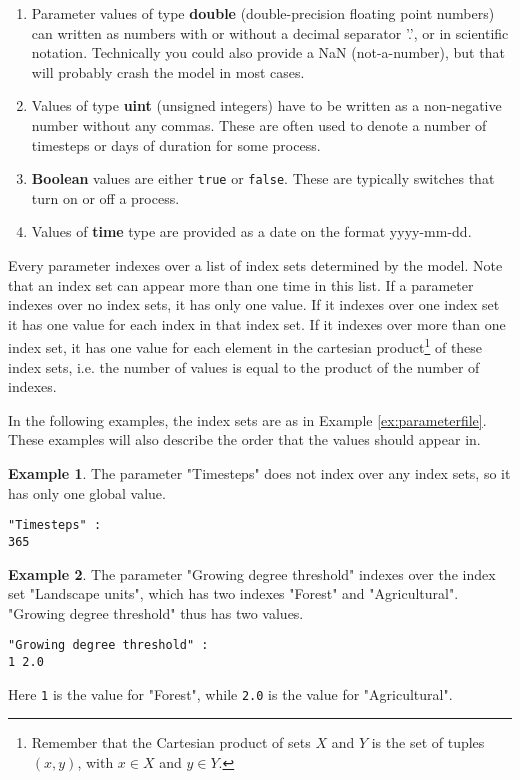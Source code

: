\documentclass[11pt]{article}
\theoremstyle{definition}
\newtheorem{myexample}{Example}
\newenvironment{example}%
  {\begin{lrbox}{\examplebox}%
   \begin{minipage}{\dimexpr\linewidth-2\fboxsep}
   \begin{myexample}}%
  {\end{myexample}%
   \end{minipage}%
   \end{lrbox}%
   \begin{trivlist}
     \item[]\colorbox{silver}{\usebox\examplebox}
   \end{trivlist}}
\begin{document}
\begin{enumerate}[i]
\item Parameter values of type {\bf double} (double-precision floating point numbers) can written as numbers with or without a decimal separator '.', or in scientific notation. Technically you could also provide a NaN (not-a-number), but that will probably crash the model in most cases.
\item Values of type {\bf uint} (unsigned integers) have to be written as a non-negative number without any commas. These are often used to denote a number of timesteps or days of duration for some process.
\item {\bf Boolean} values are either {\tt true} or {\tt false}. These are typically switches that turn on or off a process.
\item Values of {\bf time} type are provided as a date on the format yyyy-mm-dd.
\end{enumerate}

Every parameter indexes over a list of index sets determined by the model. Note that an index set can appear more than one time in this list. If a parameter indexes over no index sets, it has only one value. If it indexes over one index set it has one value for each index in that index set. If it indexes over more than one index set, it has one value for each element in the cartesian product\footnote{Remember that the Cartesian product of sets $X$ and $Y$ is the set of tuples $(x, y)$, with $x\in X$ and $y\in Y$.} of these index sets, i.e. the number of values is equal to the product of the number of indexes.

In the following examples, the index sets are as in Example \ref{ex:parameterfile}. These examples will also describe the order that the values should appear in.

\begin{example}
The parameter "Timesteps" does not index over any index sets, so it has only one global value.
\begin{lstlisting}
"Timesteps" :
365
\end{lstlisting}
\end{example}

\begin{example}
The parameter "Growing degree threshold" indexes over the index set "Landscape units", which has two indexes "Forest" and "Agricultural". "Growing degree threshold" thus has two values.
\begin{lstlisting}
"Growing degree threshold" :
1 2.0
\end{lstlisting}
Here {\tt 1} is the value for "Forest", while {\tt 2.0} is the value for "Agricultural".
\end{example}
\end{document}
